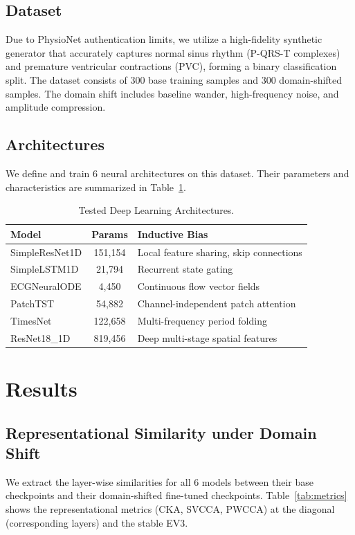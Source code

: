 \documentclass[twocolumn]{article}
\begin{document}
\subsection{Dataset}
Due to PhysioNet authentication limits, we utilize a high-fidelity synthetic generator that accurately captures normal sinus rhythm (P-QRS-T complexes) and premature ventricular contractions (PVC), forming a binary classification split. The dataset consists of 300 base training samples and 300 domain-shifted samples. The domain shift includes baseline wander, high-frequency noise, and amplitude compression.

\subsection{Architectures}
We define and train 6 neural architectures on this dataset. Their parameters and characteristics are summarized in Table~\ref{tab:params}.

\begin{table}[htbp]
\centering
\caption{Tested Deep Learning Architectures.}
\label{tab:params}
\begin{tabular}{lcl}
\toprule
Model & Params & Inductive Bias \\
\midrule
SimpleResNet1D & 151,154 & Local feature sharing, skip connections \\
SimpleLSTM1D   & 21,794  & Recurrent state gating \\
ECGNeuralODE   & 4,450   & Continuous flow vector fields \\
PatchTST       & 54,882  & Channel-independent patch attention \\
TimesNet       & 122,658 & Multi-frequency period folding \\
ResNet18\_1D   & 819,456 & Deep multi-stage spatial features \\
\bottomrule
\end{tabular}
\end{table}

\section{Results}
\label{sec:results}

\subsection{Representational Similarity under Domain Shift}
We extract the layer-wise similarities for all 6 models between their base checkpoints and their domain-shifted fine-tuned checkpoints. Table~\ref{tab:metrics} shows the representational metrics (CKA, SVCCA, PWCCA) at the diagonal (corresponding layers) and the stable EV3.
\end{document}
